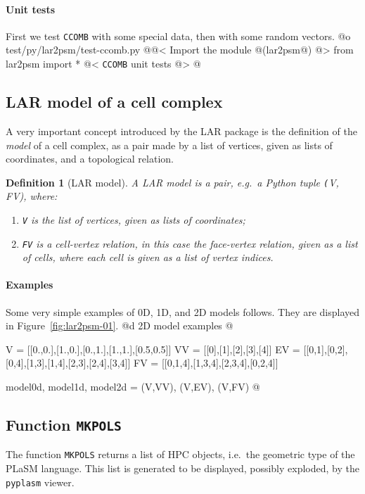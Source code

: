 \documentclass[11pt,oneside]{article}	%
\newtheorem*{mydef}{Definition}
\begin{document}
\paragraph{Unit tests}
First we test \texttt{CCOMB} with some special data, then with some random vectors.
@o test/py/lar2psm/test-ccomb.py
@{@< Import the module @(lar2psm@) @>
from lar2psm import *
@< \texttt{CCOMB} unit tests @>
@}

\subsection{LAR model of a cell complex}

A very important concept introduced by the LAR package is the definition of the \emph{model} of a cell complex, as a pair made by a list of vertices, given as lists of coordinates, and a topological relation.

\begin{mydef}[LAR model]
A \emph{LAR model} is a pair, e.g.~a Python tuple \emph{\texttt(V, FV)}, where:
\begin{enumerate}
\item \texttt{V} is the list of vertices, given as lists of coordinates;
\item \texttt{FV} is a \emph{cell-vertex} relation, in this case the face-vertex relation, given as a list of cells, where each cell is given as a list of vertex indices.
\end{enumerate}
\end{mydef}

\paragraph{Examples} Some very simple examples of 0D, 1D, and 2D models follows. They are displayed in Figure~\ref{fig:lar2psm-01}.
@d 2D model examples 
@{V = [[0.,0.],[1.,0.],[0.,1.],[1.,1.],[0.5,0.5]]
VV = [[0],[1],[2],[3],[4]]
EV = [[0,1],[0,2],[0,4],[1,3],[1,4],[2,3],[2,4],[3,4]]
FV = [[0,1,4],[1,3,4],[2,3,4],[0,2,4]]

model0d, model1d, model2d = (V,VV), (V,EV), (V,FV)
@}

\subsection{Function \texttt{MKPOLS}}

The function \texttt{MKPOLS} returns a list of HPC objects, i.e.~the geometric type of the PLaSM language. This list is generated to be displayed, possibly exploded, by the \texttt{pyplasm} viewer. 
\end{document}
